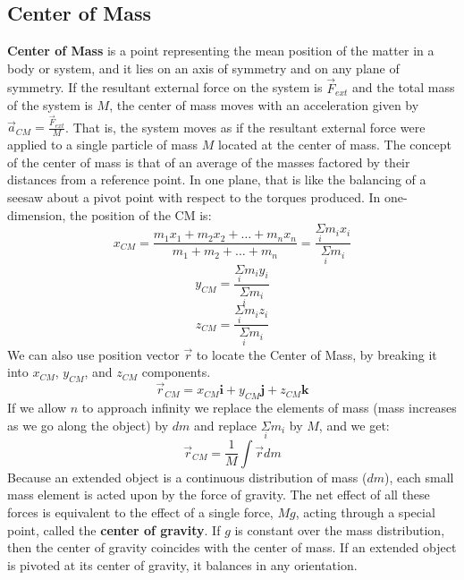 \documentclass{article}
\begin{document}
	\subsection{Center of Mass}
    	\textbf{Center of Mass} is a point representing the mean position of the matter in a body or system, and it lies on an axis of symmetry and on any plane of symmetry. If the resultant external force on the system is $\vec{F}_{ext}$ and the total mass of the system is $M$, the center of mass moves with an acceleration given by $\vec{a}_{CM}=\frac{\vec{F}_{ext}}{M}$. That is, the system moves as if the resultant external force were applied to a single particle of mass $M$ located at the center of mass. The concept of the center of mass is that of an average of the masses factored by their distances from a reference point. In one plane, that is like the balancing of a seesaw about a pivot point with respect to the torques produced. In one-dimension, the position of the CM is:
        \[
        	x_{CM}=\frac{m_1x_1+m_2x_2+\ldots+m_nx_n}{m_1+m_2+\ldots+m_n}=\frac{\underset{i}{\Sigma}m_ix_i}{\underset{i}{\Sigma}m_i}
        \]
        \[
        	y_{CM}=\frac{\underset{i}{\Sigma}m_iy_i}{\underset{i}{\Sigma}m_i}
        \]
        \[
        	z_{CM}=\frac{\underset{i}{\Sigma}m_iz_i}{\underset{i}{\Sigma}m_i}
        \]
        We can also use position vector $\vec{r}$ to locate the Center of Mass, by breaking it into $x_{CM}$, $y_{CM}$, and $z_{CM}$ components.
        \[
        	\vec{r}_{CM}=x_{CM}\textbf{i}+y_{CM}\textbf{j}+z_{CM}\textbf{k}
        \]
        If we allow $n$ to approach infinity we replace the elements of mass (mass increases as we go along the object) by $dm$ and replace $\underset{i}{\Sigma}m_i$ by $M$, and we get:
        \[
        	\vec{r}_{CM}=\frac{1}{M}\int\vec{r}dm
        \]
        Because an extended object is a continuous distribution of mass ($dm$), each small mass element is acted upon by the force of gravity. The net effect of all these forces is equivalent to the effect of a single force, $Mg$, acting through a special point, called the \textbf{center of gravity}. If $g$ is constant over the mass distribution, then the center of gravity coincides with the center of mass. If an extended object is pivoted at its center of gravity, it balances in any orientation.
        
\end{document}
